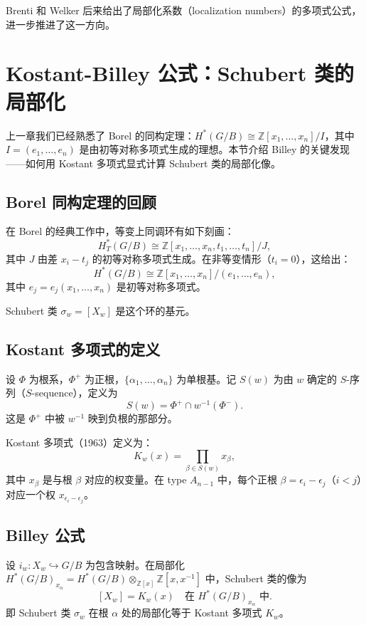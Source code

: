 Brenti 和 Welker 后来给出了局部化系数（localization numbers）的多项式公式，进一步推进了这一方向。

\section{Kostant-Billey 公式：Schubert 类的局部化}

上一章我们已经熟悉了 Borel 的同构定理：$H^*(G/B) \cong \mathbb{Z}[x_1,\ldots,x_n]/I$，其中 $I = (e_1,\ldots,e_n)$ 是由初等对称多项式生成的理想。本节介绍 Billey 的关键发现——如何用 Kostant 多项式显式计算 Schubert 类的局部化像。

\subsection{Borel 同构定理的回顾}

在 Borel 的经典工作中，等变上同调环有如下刻画：
$$H_T^*(G/B) \cong \mathbb{Z}[x_1,\ldots,x_n, t_1,\ldots,t_n]/J,$$
其中 $J$ 由差 $x_i - t_j$ 的初等对称多项式生成。在非等变情形（$t_i = 0$），这给出：
$$H^*(G/B) \cong \mathbb{Z}[x_1,\ldots,x_n]/(e_1,\ldots,e_n),$$
其中 $e_j = e_j(x_1,\ldots,x_n)$ 是初等对称多项式。

Schubert 类 $\sigma_w = [X_w]$ 是这个环的基元。

\subsection{Kostant 多项式的定义}

设 $\Phi$ 为根系，$\Phi^+$ 为正根，$\{\alpha_1,\ldots,\alpha_n\}$ 为单根基。记 $S(w)$ 为由 $w$ 确定的 $S$-序列（$S$-sequence），定义为
$$S(w) = \Phi^+ \cap w^{-1}(\Phi^-).$$
这是 $\Phi^+$ 中被 $w^{-1}$ 映到负根的那部分。

Kostant 多项式（1963）定义为：
$$K_w(x) = \prod_{\beta \in S(w)} x_\beta,$$
其中 $x_\beta$ 是与根 $\beta$ 对应的权变量。在 type $A_{n-1}$ 中，每个正根 $\beta = \epsilon_i - \epsilon_j$（$i < j$）对应一个权 $x_{\epsilon_i - \epsilon_j}$。

\subsection{Billey 公式}

\begin{Theorem}
\label{th:KostantBilley}
设 $i_w: X_w \hookrightarrow G/B$ 为包含映射。在局部化 $H^*(G/B)_{x_\alpha} = H^*(G/B) \otimes_{\mathbb{Z}[x]} \mathbb{Z}[x, x^{-1}]$ 中，Schubert 类的像为
$$[X_w] = K_w(x) \quad \text{在 } H^*(G/B)_{x_\alpha} \text{ 中}.$$
即 Schubert 类 $\sigma_w$ 在根 $\alpha$ 处的局部化等于 Kostant 多项式 $K_w$。
\end{Theorem}

